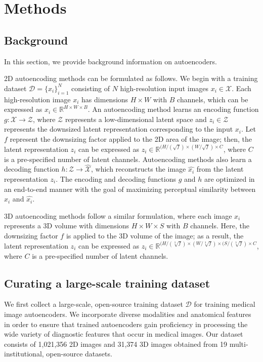 \section{Methods}
\subsection{Background}
In this section, we provide background information on autoencoders. 

2D autoencoding methods can be formulated as follows. We begin with a training dataset $\mathcal{D} = \{x_i\}_{i=1}^N$ consisting of $N$ high-resolution input images $x_i \in \mathcal{X}$. Each high-resolution image $x_i$ has dimensions $H \times W$ with $B$ channels, which can be expressed as $x_i \in \mathbb{R}^{H \times W \times B}$. An autoencoding method learns an encoding function $g: \mathcal{X} \rightarrow \mathcal{Z}$, where $\mathcal{Z}$ represents a low-dimensional latent space and $z_i \in \mathcal{Z}$ represents the downsized latent representation corresponding to the input $x_i$. Let $f$ represent the downsizing factor applied to the 2D area of the image; then, the latent representation $z_i$ can be expressed as $z_i \in \mathbb{R}^{(H/(\sqrt{f}) \times (W/\sqrt{f}) \times C}$, where $C$ is a pre-specified number of latent channels. Autoencoding methods also learn a decoding function $h: \mathcal{Z} \rightarrow \hat{\mathcal{X}}$, which reconstructs the image $\hat{x_i}$ from the latent representation $z_i$. The encoding and decoding functions $g$ and $h$ are optimized in an end-to-end manner with the goal of maximizing perceptual similarity between $x_i$ and $\hat{x_i}$.

3D autoencoding methods follow a similar formulation, where each image $x_i$ represents a 3D volume with dimensions $H \times W \times S$ with $B$ channels. Here, the downsizing factor $f$ is applied to the 3D volume of the image; as a result, the latent representation $z_i$ can be expressed as $z_i \in \mathbb{R}^{(H/(\sqrt[3]{f}) \times (W/\sqrt[3]{f}) \times (S/(\sqrt[3]{f}) \times C}$, where $C$ is a pre-specified number of latent channels. 

\subsection{Curating a large-scale training dataset}
We first collect a large-scale, open-source training dataset $\mathcal{D}$ for training medical image autoencoders. We incorporate diverse modalities and anatomical features in order to ensure that trained autoencoders gain proficiency in processing the wide variety of diagnostic features that occur in medical images. Our dataset consists of 1,021,356 2D images and 31,374 3D images obtained from 19 multi-institutional, open-source datasets.

